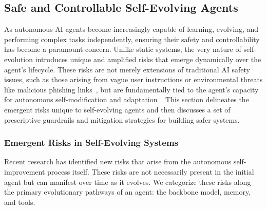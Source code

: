 \subsection{Safe and Controllable Self-Evolving Agents}



As autonomous AI agents become increasingly capable of learning, evolving, and performing complex tasks independently, ensuring their safety and controllability has become a paramount concern. Unlike static systems, the very nature of self-evolution introduces unique and amplified risks that emerge dynamically over the agent's lifecycle. These risks are not merely extensions of traditional AI safety issues, such as those arising from vague user instructions or environmental threats like malicious phishing links~\citep{zhou2025automating}, but are fundamentally tied to the agent's capacity for autonomous self-modification and adaptation~\citep{shao2025misevolution,han2025alignment}. This section delineates the emergent risks unique to self-evolving agents and then discusses a set of prescriptive guardrails and mitigation strategies for building safer systems.

\subsubsection{Emergent Risks in Self-Evolving Systems}
Recent research has identified new risks that arise from the autonomous self-improvement process itself. These risks are not necessarily present in the initial agent but can manifest over time as it evolves. We categorize these risks along the primary evolutionary pathways of an agent: the backbone model, memory, and tools.

